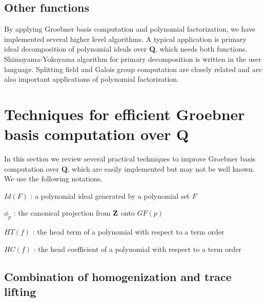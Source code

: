 \documentclass[runningheads]{cl2emult}
\begin{document}
\subsection{Other functions}
By applying Groebner basis computation and polynomial factorization,
we have implemented several higher level algorithms. A typical
application is primary ideal decomposition of polynomial ideals over
{\bf Q}, which needs both functions.  Shimoyama-Yokoyama algorithm
\cite{SY} for primary decomposition is written in the user language.
Splitting field and Galois group computation \cite{ANY} are closely
related and are also important applications of polynomial
factorization.

\section{Techniques for efficient Groebner basis computation over {\bf Q}}
\label{gbtech}

In this section we review several practical techniques to improve
Groebner basis computation over {\bf Q}, which are easily
implemented but may not be well known.
We use the following notations.
\begin{description}
\item $Id(F)$ : a polynomial ideal generated by a polynomial set $F$
\item $\phi_p$ : the canonical projection from ${\bf Z}$ onto $GF(p)$
\item $HT(f)$ : the head term of a polynomial with respect to a term order
\item $HC(f)$ : the head coefficient of a polynomial with respect to a term order
\end{description}

\subsection{Combination of homogenization and trace lifting}
\label{gbhomo}
\end{document}
